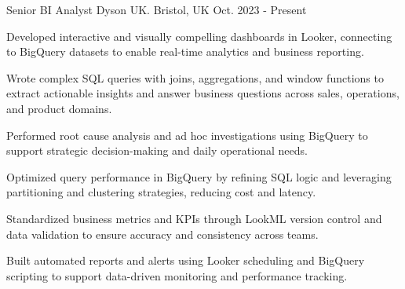

\begin{cventries}

  \cventry
    {Senior BI Analyst} %
    {Dyson UK.} %
    {Bristol, UK} %
    {Oct. 2023 - Present} %
    {
      \begin{cvitems} %
        \item {Developed interactive and visually compelling dashboards in Looker, connecting to BigQuery datasets to enable real-time analytics and business reporting.}
        \item {Wrote complex SQL queries with joins, aggregations, and window functions to extract actionable insights and answer business questions across sales, operations, and product domains.}
        \item {Performed root cause analysis and ad hoc investigations using BigQuery to support strategic decision-making and daily operational needs.}
        \item {Optimized query performance in BigQuery by refining SQL logic and leveraging partitioning and clustering strategies, reducing cost and latency.}
        \item {Standardized business metrics and KPIs through LookML version control and data validation to ensure accuracy and consistency across teams.}
        \item {Built automated reports and alerts using Looker scheduling and BigQuery scripting to support data-driven monitoring and performance tracking.}
    \end{cvitems}  
    }


\end{cventries}
